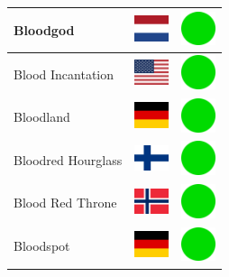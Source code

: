 \documentclass[12pt, a4paper, twoside]{report}
\begin{document}
\begin{center}
\begin{longtable}{|p{5cm}|p{2cm}|p{2cm}|}
 Bloodgod                                                   & \includegraphics[width=1cm]{../img/flags/nl} &   \includegraphics[width=1cm]{../likes/y} \\ \hline
 Blood Incantation                                          & \includegraphics[width=1cm]{../img/flags/us} &   \includegraphics[width=1cm]{../likes/y} \\ \hline
 Bloodland                                                  & \includegraphics[width=1cm]{../img/flags/de} &   \includegraphics[width=1cm]{../likes/y} \\ \hline
 Bloodred Hourglass                                         & \includegraphics[width=1cm]{../img/flags/fi} &   \includegraphics[width=1cm]{../likes/y} \\ \hline
 Blood Red Throne                                           & \includegraphics[width=1cm]{../img/flags/no} &   \includegraphics[width=1cm]{../likes/y} \\ \hline
 Bloodspot                                                  & \includegraphics[width=1cm]{../img/flags/de} &   \includegraphics[width=1cm]{../likes/y} \\ \hline

\end{longtable}
\end{center}
\end{document}
